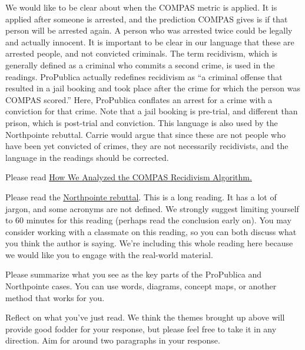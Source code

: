 \documentclass[assignment02_Solutions]{subfiles}
\begin{document}
\begin{exercise}
We would like to be clear about when the COMPAS metric is applied. It is applied after someone is arrested, and the prediction COMPAS gives is if that person will be arrested again. A person who was arrested twice could be legally and actually innocent. It is important to be clear in our language that these are arrested people, and not convicted criminals. The term recidivism, which is generally defined as a criminal who commits a second crime, is used in the readings. ProPublica actually redefines recidivism as ``a criminal offense that resulted in a jail booking and took place after the crime for which the person was COMPAS scored.'' Here, ProPublica conflates an arrest for a crime with a conviction for that crime. Note that a jail booking is pre-trial, and different than prison, which is post-trial and conviction. This language is also used by the Northpointe rebuttal. Carrie would argue that since these are not people who have been yet convicted of crimes, they are not necessarily recidivists, and the language in the readings should be corrected.

Please read \href{https://www.propublica.org/article/how-we-analyzed-the-compas-recidivism-algorithm}{How We Analyzed the COMPAS Recidivism Algorithm.}

\item Please read the \href{https://drive.google.com/file/d/1SSbotzlsVkj4L2VhPC7R_XH0VBqOQsnT/view?usp=sharing}{Northpointe rebuttal}. This is a long reading. It has a lot of jargon, and some acronyms are not defined. We strongly suggest limiting yourself to 60 minutes for this reading (perhaps read the conclusion early on). You may consider working with a classmate on this reading, so you can both discuss what you think the author is saying. We're including this whole reading here because we would like you to engage with the real-world material.
\ees
\end{exercise}

\begin{exercise}
\bes
\item Please summarize what you see as the key parts of the ProPublica and Northpointe cases. You can use words, diagrams, concept maps, or another method that works for you.
\item Reflect on what you've just read.  We think the themes brought up above will provide good fodder for your response, but please feel free to take it in any direction.  Aim for around two paragraphs in your response.
\ees
\end{exercise}
\end{document}
